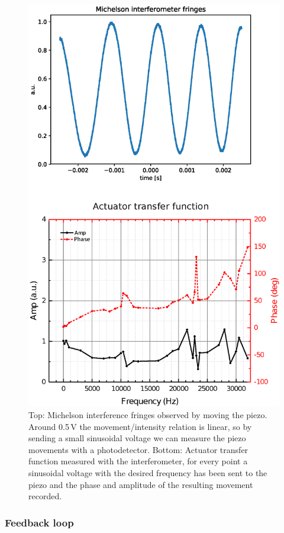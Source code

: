 \begin{figure}
	\centering
\includegraphics[width=0.8\linewidth]{images/actuator.eps}
\caption{Top: Michelson interference fringes observed by moving the piezo. Around 0.5\,V the movement/intensity relation is linear, so by sending a small sinusoidal voltage we can measure the piezo movements with a photodetector. Bottom: Actuator transfer function measured with the interferometer, for every point a sinusoidal voltage with the desired frequency has been sent to the piezo and the phase and amplitude of the resulting movement recorded.}
\label{fig:actuator}
\end{figure}

\subsubsection{Feedback loop}

